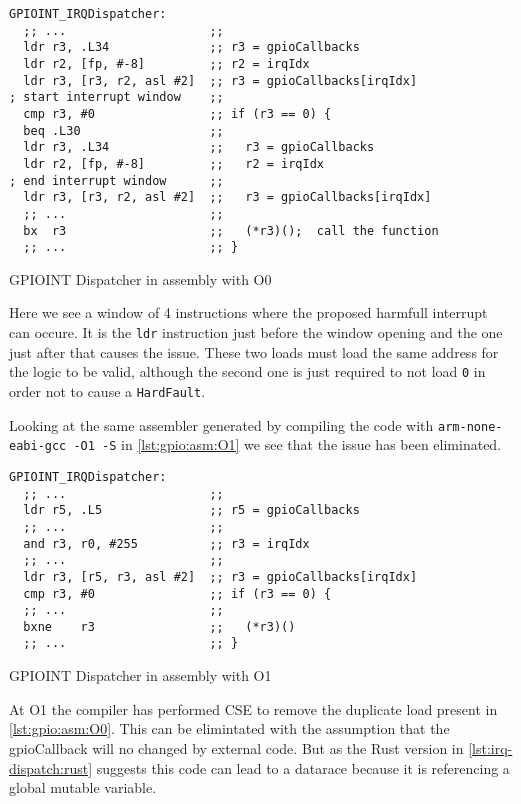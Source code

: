\begin{listing}[H]
  \begin{verbatim}
GPIOINT_IRQDispatcher:
  ;; ...                    ;;
  ldr r3, .L34              ;; r3 = gpioCallbacks
  ldr r2, [fp, #-8]         ;; r2 = irqIdx
  ldr r3, [r3, r2, asl #2]  ;; r3 = gpioCallbacks[irqIdx]
; start interrupt window    ;;
  cmp r3, #0                ;; if (r3 == 0) {
  beq .L30                  ;;
  ldr r3, .L34              ;;   r3 = gpioCallbacks
  ldr r2, [fp, #-8]         ;;   r2 = irqIdx
; end interrupt window      ;;
  ldr r3, [r3, r2, asl #2]  ;;   r3 = gpioCallbacks[irqIdx]
  ;; ...                    ;;
  bx  r3                    ;;   (*r3)();  call the function
  ;; ...                    ;; }
  \end{verbatim}
  \caption{GPIOINT Dispatcher in assembly with O0}
  \label{lst:gpio:asm:O0}
\end{listing}

Here we see a window of 4 instructions where the proposed harmfull interrupt can occure.
It is the \texttt{ldr} instruction just before the window opening and the one just after that causes the issue.
These two loads must load the same address for the logic to be valid, although the second one is just required to not load \texttt{0} in order not to cause a \texttt{HardFault}.

Looking at the same assembler generated by compiling the code with \texttt{arm-none-eabi-gcc -O1 -S} in \autoref{lst:gpio:asm:O1} we see that the issue has been eliminated.

\begin{listing}[H]
  \begin{verbatim}
GPIOINT_IRQDispatcher:
  ;; ...                    ;;
  ldr r5, .L5               ;; r5 = gpioCallbacks
  ;; ...                    ;;
  and r3, r0, #255          ;; r3 = irqIdx
  ;; ...                    ;;
  ldr r3, [r5, r3, asl #2]  ;; r3 = gpioCallbacks[irqIdx]
  cmp r3, #0                ;; if (r3 == 0) {
  ;; ...                    ;;
  bxne    r3                ;;   (*r3)()
  ;; ...                    ;; }
  \end{verbatim}
  \caption{GPIOINT Dispatcher in assembly with O1}
  \label{lst:gpio:asm:O1}
\end{listing}

At O1 the compiler has performed \gls{CSE} to remove the duplicate load present in \autoref{lst:gpio:asm:O0}.
This can be elimintated with the assumption that the gpioCallback will no changed by external code.
But as the Rust version in \autoref{lst:irq-dispatch:rust} suggests this code can lead to a datarace because it is referencing a global mutable variable.

